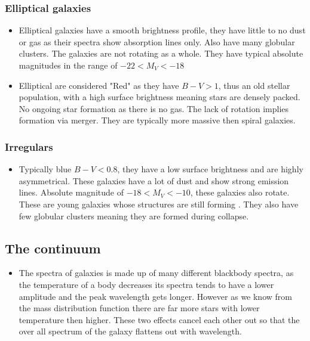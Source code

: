 \documentclass[11pt]{article}
\numberwithin{equation}{section}
\begin{document}
\subsubsection{Elliptical galaxies}
\begin{itemize}
    \item Elliptical galaxies have a smooth brightness profile, they have little to no dust or gas as their spectra show absorption lines only. Also have many globular clusters. The galaxies are not rotating as a whole. They have typical absolute magnitudes in the range of $-22<M_V < -18$

\item Elliptical are considered "Red" as they have $B-V >1$, thus an old stellar population, with a high surface brightness meaning stars are densely packed. No ongoing star formation as there is no gas. The lack of rotation implies formation via merger. They are typically more massive then spiral galaxies.
\end{itemize}

\subsubsection{Irregulars}
\begin{itemize}
    \item Typically blue $B-V<0.8$, they have a low surface brightness and are highly asymmetrical. These galaxies have a lot of dust and show strong emission lines.  Absolute magnitude of $-18 < M_V < -10$, these galaxies also rotate.  These are young galaxies whose structures are still forming . They also have few globular clusters meaning they are formed during collapse. 
\end{itemize}

\subsection{The continuum}
\begin{itemize}
    \item The spectra of galaxies is made up of many different blackbody spectra, as the temperature of a body decreases its spectra tends to have a lower amplitude and the peak wavelength gets longer.  However as we know from the mass distribution function there are far more stars with lower temperature then higher. These two effects cancel each other out so that the over all spectrum of the galaxy flattens out with wavelength. 
\end{itemize}
\end{document}
